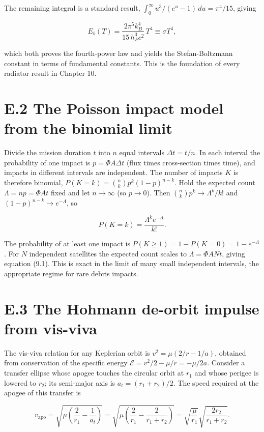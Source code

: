 \documentclass[
  11pt,
  openany,
  oneside]{book}
\begin{document}
The remaining integral is a standard result,
\(\int_0^\infty u^3/(e^u-1)\, du = \pi^4/15\), giving

\[E_b(T) = \frac{2\pi^5 k_B^4}{15\, h_P^3 c^2}\, T^4 \equiv \sigma T^4,\]

which both proves the fourth-power law and yields the Stefan-Boltzmann
constant in terms of fundamental constants. This is the foundation of
every radiator result in Chapter 10.

\section{E.2 The Poisson impact model from the binomial
limit}\label{e.2-the-poisson-impact-model-from-the-binomial-limit}

Divide the mission duration \(t\) into \(n\) equal intervals
\(\Delta t = t/n\). In each interval the probability of one impact is
\(p = \Phi A \Delta t\) (flux times cross-section times time), and
impacts in different intervals are independent. The number of impacts
\(K\) is therefore binomial, \(P(K=k) = \binom{n}{k} p^k (1-p)^{n-k}\).
Hold the expected count \(\Lambda = n p = \Phi A t\) fixed and let
\(n\to\infty\) (so \(p\to 0\)). Then
\(\binom{n}{k} p^k \to \Lambda^k/k!\) and
\((1-p)^{n-k} \to e^{-\Lambda}\), so

\[P(K=k) = \frac{\Lambda^k e^{-\Lambda}}{k!}.\]

The probability of at least one impact is
\(P(K\ge 1) = 1 - P(K=0) = 1 - e^{-\Lambda}\). For \(N\) independent
satellites the expected count scales to \(\Lambda = \Phi A N t\), giving
equation (9.1). This is exact in the limit of many small independent
intervals, the appropriate regime for rare debris impacts.

\section{E.3 The Hohmann de-orbit impulse from
vis-viva}\label{e.3-the-hohmann-de-orbit-impulse-from-vis-viva}

The vis-viva relation for any Keplerian orbit is
\(v^2 = \mu(2/r - 1/a)\), obtained from conservation of the specific
energy \(\mathcal{E} = v^2/2 - \mu/r = -\mu/2a\). Consider a transfer
ellipse whose apogee touches the circular orbit at \(r_1\) and whose
perigee is lowered to \(r_2\); its semi-major axis is
\(a_t = (r_1 + r_2)/2\). The speed required at the apogee of this
transfer is

\[v_{\mathrm{apo}} = \sqrt{\mu\left(\frac{2}{r_1} - \frac{1}{a_t}\right)}
= \sqrt{\mu\left(\frac{2}{r_1} - \frac{2}{r_1 + r_2}\right)}
= \sqrt{\frac{\mu}{r_1}}\sqrt{\frac{2 r_2}{r_1 + r_2}}.\]
\end{document}
